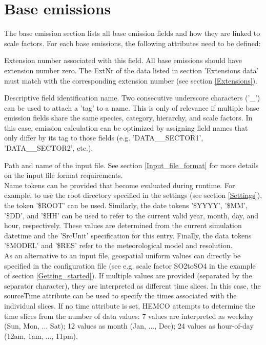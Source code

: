 \documentclass[12pt,a4paper]{article} %
\begin{document}
\section{Base emissions} \label{Base_emissions}
The base emission section lists all base emission fields and how they are linked to scale factors. For each base emissions, the following attributes need to be defined:
\begin{description} \itemsep0pt
\item [ExtNr] Extension number associated with this field. All base emissions should have extension number zero. The ExtNr of the data listed in section 'Extensions data' must match with the corresponding extension number (see section \ref{Extensions}).
\item [Name] Descriptive field identification name. Two consecutive underscore characters ('\_') can be used to attach a 'tag' to a name. This is only of relevance if multiple base emission fields share the same species, category, hierarchy, and scale factors. In this case, emission calculation can be optimized by assigning field names that only differ by its tag to those fields (e.g. 'DATA\_\_SECTOR1', 'DATA\_\_SECTOR2', etc.).
\item [sourceFile] Path and name of the input file. See section \ref{Input_file_format} for more details on the input file format requirements.\\
Name tokens can be provided that become evaluated during runtime. For example, to use the root directory specified in the settings (see section \ref{Settings}), the token '\$ROOT' can be used. Similarly,
the date tokens '\$YYYY', '\$MM', '\$DD', and '\$HH' can be used to refer to the current valid year, month, day, and hour, respectively. These values are determined from the current simulation datetime and the 'SrcUnit' specification for this entry. Finally, the data tokens '\$MODEL' and '\$RES' refer to the meteorological model and resolution.\\
As an alternative to an input file, geospatial uniform values can directly be specified in the configuration file (see e.g. scale factor SO2toSO4 in the example of section \ref{Getting_started}). If multiple values are provided (separated by the separator character), they are interpreted as different time slices. In this case, the sourceTime attribute can be used to specify the times associated with the individual slices. If no time attribute is set, HEMCO attempts to determine the time slices from the number of data values: 7 values are interpreted as weekday (Sun, Mon, ... Sat); 12 values  as month (Jan, ..., Dec); 24 values as hour-of-day (12am, 1am, ..., 11pm).\\

\end{description}
\end{document}
